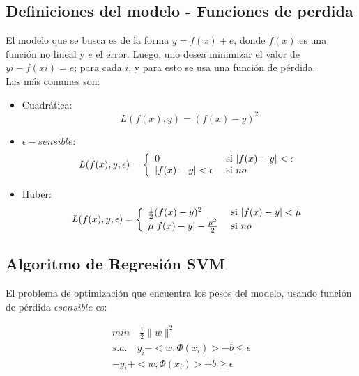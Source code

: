\subsection{Definiciones del modelo - Funciones de perdida}
El modelo que se busca es de la forma $y=f(x)+e$, donde $f(x)$ es una función no lineal y $e$ el error. Luego, uno desea minimizar el valor de $yi-f(xi)=e$; para cada $i$, y para esto se usa una función de pérdida.\\
Las más comunes son:
	\begin{itemize}
		\item Cuadr\'atica: 
		\begin{equation*} 
		L(f(x),y) = (f(x)-y)^2
		\end{equation*}
		\item $\epsilon - sensible$: 
		\begin{equation*} 
		L(f(x),y,\epsilon) = \left\lbrace
		\begin{array}{ll}
		0 & \textup{ si }| f(x) - y| < \epsilon \\
		| f(x) - y| < \epsilon & \textup{ si } no
		\end{array}
		\right.
		\end{equation*}
		\item Huber:  
		\begin{equation*} 
		L(f(x),y,\epsilon) = \left\lbrace
		\begin{array}{ll}
		\frac{1}{2}(f(x) - y)^2 & \textup{ si }| f(x) - y| < \mu \\
		\mu| f(x) - y| - \frac{\mu^2} {2} & \textup{ si } no
		\end{array}
		\right.
		\end{equation*}
	\end{itemize}    
	
\subsection{Algoritmo de Regresi\'on SVM}
	El problema de optimizaci\'on que encuentra los pesos del modelo, usando funci\'on de p\'erdida $\epsilon sensible$ es:
	
	\begin{equation}\label{eq1}
	\begin{gathered}
	min \quad \frac{1}{2} \| w \|^2  \\  
	s.a. \quad y_i- < w, \Phi(x_i) > -b \le \epsilon \\
	-y_i+ < w, \Phi(x_i) > +b \geq \epsilon 
	\end{gathered}
	\end{equation}
	
